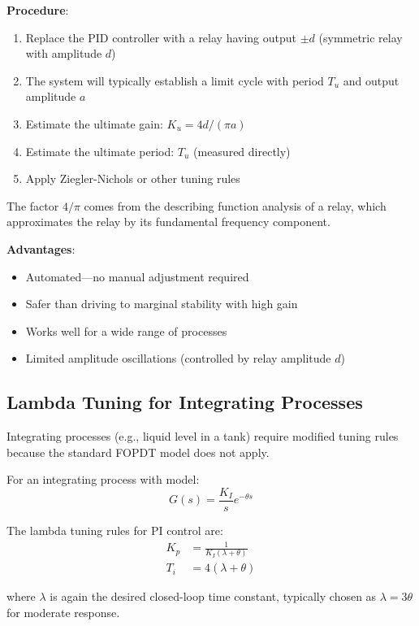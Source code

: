 \textbf{Procedure}:
\begin{enumerate}
    \item Replace the PID controller with a relay having output $\pm d$ (symmetric relay with amplitude $d$)
    \item The system will typically establish a limit cycle with period $T_u$ and output amplitude $a$
    \item Estimate the ultimate gain: $K_u = 4d/(\pi a)$
    \item Estimate the ultimate period: $T_u$ (measured directly)
    \item Apply Ziegler-Nichols or other tuning rules
\end{enumerate}

The factor $4/\pi$ comes from the describing function analysis of a relay, which approximates the relay by its fundamental frequency component.

\textbf{Advantages}:
\begin{itemize}
    \item Automated---no manual adjustment required
    \item Safer than driving to marginal stability with high gain
    \item Works well for a wide range of processes
    \item Limited amplitude oscillations (controlled by relay amplitude $d$)
\end{itemize}

\subsection{Lambda Tuning for Integrating Processes}
\label{subsec:lambda_tuning}

Integrating processes (e.g., liquid level in a tank) require modified tuning rules because the standard FOPDT model does not apply.

For an integrating process with model:
\begin{equation}
G(s) = \frac{K_I}{s} e^{-\theta s}
\end{equation}

The lambda tuning rules for PI control are:
\begin{align}
K_p &= \frac{1}{K_I(\lambda + \theta)} \\
T_i &= 4(\lambda + \theta)
\end{align}

where $\lambda$ is again the desired closed-loop time constant, typically chosen as $\lambda = 3\theta$ for moderate response.

